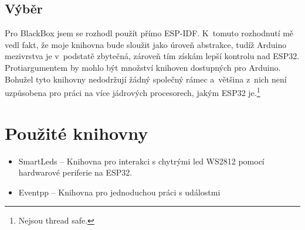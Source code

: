 \subsection{Výběr}

Pro BlackBox jsem se rozhodl použít přímo ESP-IDF.
K~tomuto rozhodnutí mě vedl fakt, že moje knihovna bude sloužit jako úroveň abstrakce, tudíž Arduino mezivrstva je v~podstatě zbytečná, zároveň tím získám lepší kontrolu nad ESP32.
Protiargumentem by mohlo být množství knihoven dostupných pro Arduino.
Bohužel tyto knihovny nedodržují žádný společný rámec a~většina z~nich není uzpůsobena pro práci na více jádrových procesorech, jakým ESP32 je.\footnote{Nejsou thread safe.}

\section{Použité knihovny}

\begin{itemize}
    \item SmartLeds \cite{SmartLeds} --
        Knihovna pro interakci s chytrými led WS2812 pomocí hardwarové periferie na ESP32. %
    \item Eventpp --
        Knihovna pro jednoduchou práci s událostmi
\end{itemize}